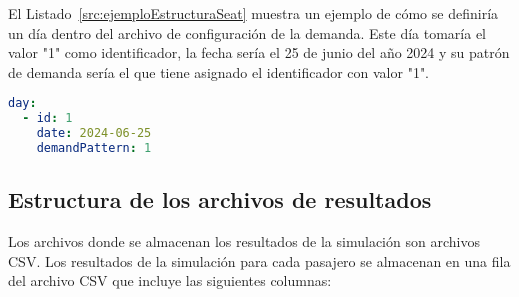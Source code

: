 El Listado~\ref{src:ejemploEstructuraSeat} muestra un ejemplo de cómo se definiría un día dentro del archivo de configuración de la demanda. Este día tomaría el valor "1" como identificador, la fecha sería el 25 de junio del año 2024 y su patrón de demanda sería el que tiene asignado el identificador con valor "1".

\begin{lstlisting}[language=YAML,
                   frame=none,
                   numbers=none,
                   basicstyle=\ttfamily\normalsize,
                   caption={Ejemplo con datos reales de la estructura de \texttt{day}},
                   label=src:ejemploEstructuraDay,
                   inputencoding=utf8]
day:
  - id: 1
    date: 2024-06-25
    demandPattern: 1 
\end{lstlisting}

\subsection{Estructura de los archivos de resultados}\label{sec:EstructuraArchivoResultados}

Los archivos donde se almacenan los resultados de la simulación son archivos \acrshort{CSV}. Los resultados de la simulación para cada pasajero se almacenan en una fila del archivo \acrshort{CSV} que incluye las siguientes columnas:

